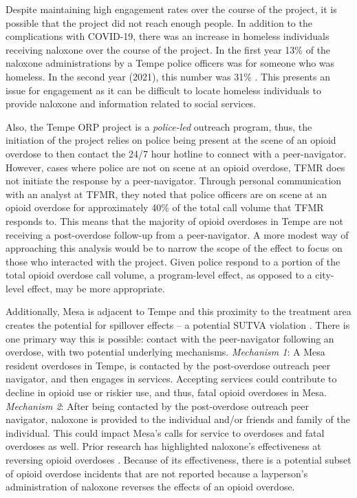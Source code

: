 Despite maintaining high engagement rates over the course of the project, it is possible that the project did not reach enough people. In addition to the complications with COVID-19, there was an increase in homeless individuals receiving naloxone over the course of the project. In the first year 13\% of the naloxone administrations by a Tempe police officers was for someone who was homeless. In the second year (2021), this number was 31\% \parencite{watts_tempe_2023}. This presents an issue for engagement as it can be difficult to locate homeless individuals to provide naloxone and information related to social services.

Also, the Tempe ORP project is a \textit{police-led} outreach program, thus, the initiation of the project relies on police being present at the scene of an opioid overdose to then contact the 24/7 hour hotline to connect with a peer-navigator. However, cases where police are not on scene at an opioid overdose, TFMR does not initiate the response by a peer-navigator. Through personal communication with an analyst at TFMR, they noted that police officers are on scene at an opioid overdose for approximately 40\% of the total call volume that TFMR responds to. This means that the majority of opioid overdoses in Tempe are not receiving a post-overdose follow-up from a peer-navigator. A more modest way of approaching this analysis would be to narrow the scope of the effect to focus on those who interacted with the project. Given police respond to a portion of the total opioid overdose call volume, a program-level effect, as opposed to a city-level effect, may be more appropriate.

Additionally, Mesa is adjacent to Tempe and this proximity to the treatment area creates the potential for spillover effects -- a potential SUTVA violation \parencite{rubin_formal_1990}. There is one primary way this is possible: contact with the peer-navigator following an overdose, with two potential underlying mechanisms. \textit{Mechanism 1}: A Mesa resident overdoses in Tempe, is contacted by the post-overdose outreach peer navigator, and then engages in services. Accepting services could contribute to decline in opioid use or riskier use, and thus, fatal opioid overdoses in Mesa. \textit{Mechanism 2}: After being contacted by the post-overdose outreach peer navigator, naloxone is provided to the individual and/or friends and family of the individual. This could impact Mesa's calls for service to overdoses and fatal overdoses as well. Prior research has highlighted naloxone's effectiveness at reversing opioid overdoses \parencite{giglio_effectiveness_2015}. Because of its effectiveness, there is a potential subset of opioid overdose incidents that are not reported because a layperson's administration of naloxone reverses the effects of an opioid overdose. 

